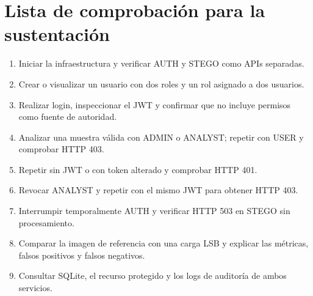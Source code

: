 \documentclass[11pt,a4paper,oneside]{article}
\begin{document}
\section{Lista de comprobación para la sustentación}
\begin{enumerate}
\item Iniciar la infraestructura y verificar AUTH y STEGO como APIs separadas.
\item Crear o visualizar un usuario con dos roles y un rol asignado a dos usuarios.
\item Realizar login, inspeccionar el JWT y confirmar que no incluye permisos como fuente de autoridad.
\item Analizar una muestra válida con ADMIN o ANALYST; repetir con USER y comprobar HTTP 403.
\item Repetir sin JWT o con token alterado y comprobar HTTP 401.
\item Revocar ANALYST y repetir con el mismo JWT para obtener HTTP 403.
\item Interrumpir temporalmente AUTH y verificar HTTP 503 en STEGO sin procesamiento.
\item Comparar la imagen de referencia con una carga LSB y explicar las métricas, falsos positivos y falsos negativos.
\item Consultar SQLite, el recurso protegido y los logs de auditoría de ambos servicios.
\end{enumerate}
\end{document}
